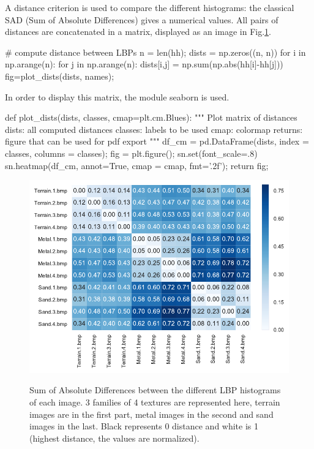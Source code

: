 A distance criterion is used to compare the different histograms: the classical SAD (Sum of Absolute Differences) gives a numerical values. All pairs of distances are concatenated in a matrix, displayed as an image in Fig.\ref{fig:lbp:python:dists}.

\begin{python}
# compute distance between LBPs
n = len(hh);
dists = np.zeros((n, n))
for i in np.arange(n):
    for j in np.arange(n):
        dists[i,j] = np.sum(np.abs(hh[i]-hh[j]))
fig=plot_dists(dists, names);
\end{python}

In order to display this matrix, the module seaborn is used.
\begin{python}
def plot_dists(dists, classes, cmap=plt.cm.Blues):
    """
    Plot matrix of distances
    dists: all computed distances
    classes: labels to be used
    cmap: colormap
    returns: figure that can be used for pdf export
    """
    df_cm = pd.DataFrame(dists, index = classes, columns = classes);
    fig = plt.figure();
    sn.set(font_scale=.8)
    sn.heatmap(df_cm, annot=True, cmap = cmap, fmt='.2f');
    return fig;
\end{python}

\vspace*{-10pt}

\begin{figure}[H]
 \centering\caption{Sum of Absolute Differences between the different LBP histograms of each image. 3 families of 4 textures are represented here, terrain images are in the first part, metal images in the second and sand images in the last. Black represents 0  distance and white is 1 (highest distance, the values are normalized).}%
 \includegraphics[width=.8\linewidth]{distances.python.pdf}%
 \label{fig:lbp:python:dists}%
\end{figure}

